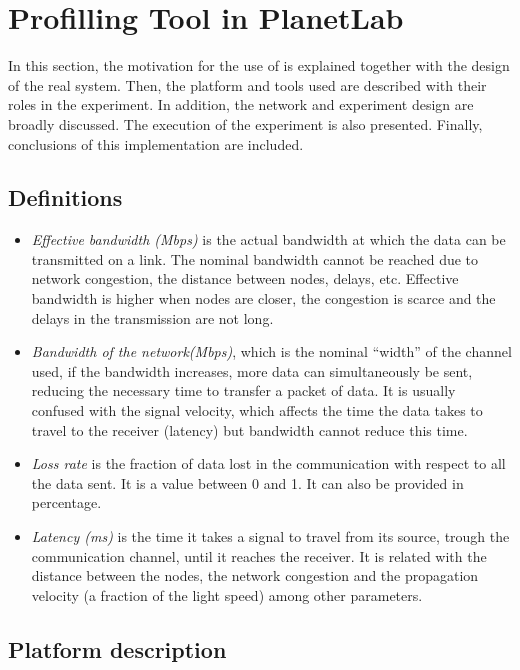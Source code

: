 
\section{Profilling Tool in PlanetLab}
\label{sec:planetlab}
In this section, the motivation for the use of \pl is explained together
with the design of the real system. Then, the platform and tools used are
described with their roles in the experiment. In addition, the network and
experiment design are broadly discussed. The execution of the experiment is also
presented. Finally, conclusions of this implementation are included.


\subsection{Definitions}
\begin{itemize}
\item\emph{Effective bandwidth (Mbps)} is the actual bandwidth at which the data
  can be transmitted on a link. The nominal bandwidth cannot be reached due to
  network congestion, the distance between nodes, delays, etc. Effective bandwidth is higher when nodes are closer, the congestion is scarce and the delays in the transmission are not long.
\item\emph{Bandwidth of the network(Mbps)}, which is the nominal ``width'' of the channel used, if the bandwidth increases, more data can simultaneously be sent, reducing the necessary time to transfer a packet of data. It is usually confused with the signal velocity, which affects the time the data takes to travel to the receiver (latency) but bandwidth cannot reduce this time.
\item\emph{Loss rate} is the fraction of data lost in the communication with respect
to all the data sent. It is a value between 0 and 1. It can also be provided in
percentage.

\item\emph{Latency (ms)} is the time it takes a signal to travel from its source, trough the communication channel, until it reaches the receiver. It is related with the distance between the nodes, the network congestion and the propagation velocity (a fraction of the light speed) among other parameters.
\end{itemize}

\subsection{Platform description}

